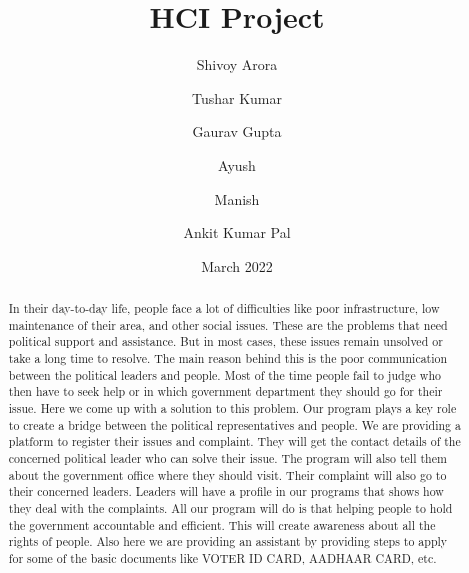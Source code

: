 \documentclass[acmtog]{acmart}
\title{HCI Project}
\author{Shivoy Arora}
\author{Tushar Kumar}
\author{Gaurav Gupta}
\author{Ayush}
\author{Manish}
\author{Ankit Kumar Pal}
\date{March 2022}
\begin{document}
\begin{abstract}
    In their day-to-day life, people face a lot of difficulties like poor infrastructure, low maintenance of their area, and other social issues. These are the problems that need political support and assistance. But in most cases, these issues remain unsolved or take a long time to resolve. The main reason behind this is the poor communication between the political leaders and people. Most of the time people fail to judge who then have to seek help or in which government department they should go for their issue. Here we come up with a solution to this problem. Our program plays a key role to create a bridge between the political representatives and people. We are providing a platform to register their issues and complaint. They will get the contact details of the concerned political leader who can solve their issue. The program will also tell them about the government office where they should visit. Their complaint will also go to their concerned leaders. Leaders will have a profile in our programs that shows how they deal with the complaints. All our program will do is that helping people to hold the government accountable and efficient. This will create awareness about all the rights of people. Also here we are providing an assistant by providing steps to apply for some of the basic documents like VOTER ID CARD, AADHAAR CARD, etc.
\end{abstract}

\maketitle
\end{document}
